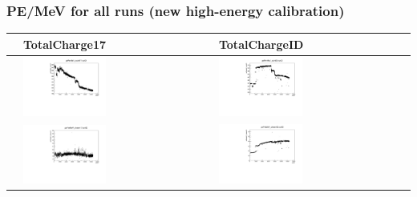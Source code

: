 \documentclass{beamer}
\begin{document}
\begin{frame}
	\frametitle{PE/MeV for all runs (new high-energy calibration)}
	\begin{tabular}{|C|V|V|}
		\hline
		&TotalCharge17 &TotalChargeID \\
		\hline
		 &
		\includegraphics[width=0.45\textwidth]{scint17_allRuns.pdf} &
		\includegraphics[width=0.45\textwidth]{scintID_allRuns.pdf} \\
		\hline
		 &
		\includegraphics[width=0.45\textwidth]{cheren17_allRuns.pdf} &
		\includegraphics[width=0.45\textwidth]{cherenID_allRuns.pdf} \\
		\hline
	\end{tabular}
\end{frame}
\end{document}
